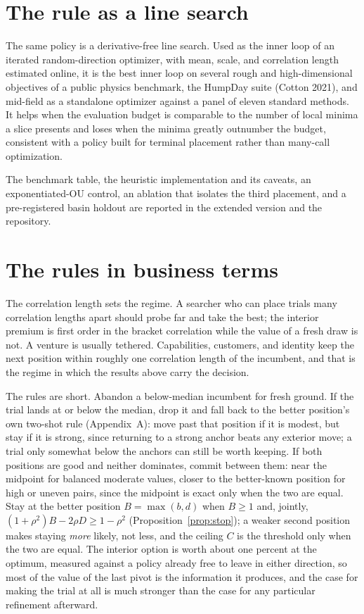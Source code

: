 \documentclass[11pt]{article}
\theoremstyle{itheads}
\begin{document}
\section{The rule as a line search}\label{sec:linesearch}

The same policy is a derivative-free line search. Used as the inner
loop of an iterated random-direction optimizer, with mean, scale, and
correlation length estimated online, it is the best inner loop on
several rough and high-dimensional objectives of a public physics
benchmark, the HumpDay suite (Cotton 2021), and mid-field as a
standalone optimizer against a panel of eleven standard methods. It
helps when the evaluation budget is comparable to the number of local
minima a slice presents and loses when the minima greatly outnumber
the budget, consistent with a policy built for terminal placement
rather than many-call optimization.

The benchmark table, the heuristic implementation and its caveats, an
exponentiated-OU control, an ablation that isolates the third
placement, and a pre-registered basin holdout are reported in the
extended version and the repository.

\section{The rules in business terms}

The correlation length sets the regime. A searcher who can place
trials many correlation lengths apart should probe far and take the
best; the interior premium is first order in the bracket correlation
while the value of a fresh draw is not. A venture is usually
tethered. Capabilities, customers, and identity keep the next
position within roughly one correlation length of the incumbent, and
that is the regime in which the results above carry the decision.

The rules are short. Abandon a below-median incumbent for fresh
ground. If the trial lands at or below the median, drop it and fall
back to the better position's own two-shot rule (Appendix~A): move
past that position if it is modest, but stay if it is strong, since
returning to a strong anchor beats any exterior move; a trial only
somewhat below the anchors can still be worth keeping. If both
positions are good and neither dominates, commit between them: near
the midpoint for balanced moderate values, closer to the better-known
position for high or uneven pairs, since the midpoint is exact only
when the two are equal. Stay at the better position $B=\max(b,d)$ when
$B\ge 1$ and, jointly, $(1+\rho^{2})B-2\rho D\ge 1-\rho^{2}$
(Proposition~\ref{prop:stop}); a weaker second position makes staying
\emph{more} likely, not less, and the ceiling $C$ is the threshold
only when the two are equal. The interior option is worth about one percent at the
optimum, measured against a policy already free to leave in either
direction, so most of the value of the last pivot is the information
it produces, and the case for making the trial at all is much
stronger than the case for any particular refinement afterward.
\end{document}
